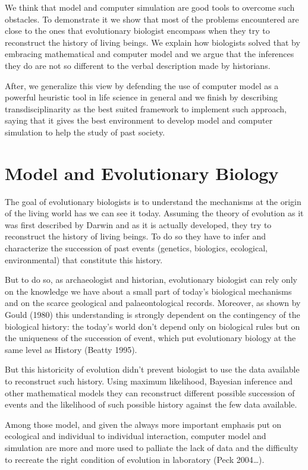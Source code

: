 \documentclass[a4paper]{article}
\begin{document}
We think that model and computer simulation are good tools to overcome such obstacles. To demonstrate it we show that most of the problems encountered are close to the ones that evolutionary biologist encompass when they try to reconstruct the history of living beings. We explain how biologists solved that by embracing mathematical and computer model and we argue that the inferences they do are not so different to the verbal description made by historians.

After, we  generalize this view by defending the use of computer model as a powerful heuristic tool in life science in general and we finish by describing transdisciplinarity as the best suited framework to implement such approach, saying that it gives the best environment to develop model and computer simulation to help the study of past society.

\section{Model and Evolutionary Biology }
The goal of evolutionary biologists is to understand the mechanisms at the origin of the living world has we can see it today. Assuming the theory of evolution as it was first described by Darwin and as it is actually developed, they try to reconstruct the history of living beings. To do so they have to infer and characterize the succession of past events (genetics, biologics, ecological, environmental) that constitute this history. 

But to do so, as archaeologist and historian, evolutionary biologist can rely only on the knowledge we have about a small part of today's biological mechanisms and on the scarce geological and palaeontological records.  Moreover, as shown by Gould (1980) this understanding is strongly dependent on the contingency of the biological history: the today's world don't depend only on biological rules but on the uniqueness of the succession of event, which put evolutionary biology at the same level as History (Beatty 1995).  

But this historicity of evolution didn't prevent biologist to use the data available to reconstruct such history. Using maximum likelihood, Bayesian inference and other mathematical models they can reconstruct different possible succession of events and the likelihood of such possible history against the few data available.

Among those model, and given the always more important emphasis put on ecological and individual to individual interaction, computer model and simulation are more and more used to palliate the lack of data and the difficulty to recreate the right condition of evolution in laboratory (Peck 2004\ldots).
\end{document}
